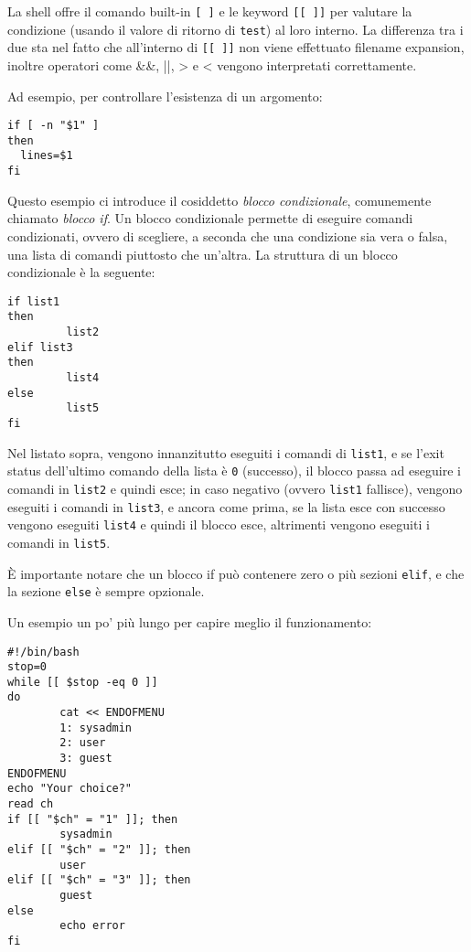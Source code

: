 La shell offre il comando built-in \verb_[ ]_ e le keyword
\verb_[[ ]]_ per valutare la condizione (usando il valore di
ritorno di \texttt{test}) al loro interno. La differenza tra i
due sta nel fatto che all'interno di \verb_[[ ]]_ non viene
effettuato filename expansion, inoltre operatori come \&\&, ||,
> e < vengono interpretati correttamente.

Ad esempio, per controllare l'esistenza di un argomento:
\begin{verbatim}
if [ -n "$1" ]
then
  lines=$1
fi
\end{verbatim}

Questo esempio ci introduce il cosiddetto \textit{blocco condizionale},
comunemente chiamato \textit{blocco if}.
Un blocco condizionale permette di eseguire comandi condizionati, ovvero di
scegliere, a seconda che una condizione sia vera o falsa, una lista di comandi
piuttosto che un'altra. La struttura di un blocco condizionale \`e la
seguente:
\begin{verbatim}
if list1
then
         list2
elif list3
then
         list4
else
         list5
fi
\end{verbatim}

Nel listato sopra, vengono innanzitutto eseguiti i comandi di \texttt{list1},
e se l'exit status dell'ultimo comando della lista \`e \texttt{0} (successo),
il blocco passa ad eseguire i comandi in \texttt{list2} e quindi esce; in
caso negativo (ovvero \texttt{list1} fallisce), vengono eseguiti i comandi in
\texttt{list3}, e ancora come prima, se la lista esce con successo vengono
eseguiti \texttt{list4} e quindi il blocco esce, altrimenti vengono eseguiti i
comandi in \texttt{list5}.

\`E importante notare che un blocco if pu\`o contenere zero o pi\`u sezioni
\texttt{elif}, e che la sezione \texttt{else} \`e sempre opzionale.

Un esempio un po' pi\`u lungo per capire meglio il funzionamento:
\begin{verbatim}
#!/bin/bash
stop=0
while [[ $stop -eq 0 ]]
do
        cat << ENDOFMENU
        1: sysadmin
        2: user
        3: guest
ENDOFMENU
echo "Your choice?"
read ch
if [[ "$ch" = "1" ]]; then
        sysadmin
elif [[ "$ch" = "2" ]]; then
        user
elif [[ "$ch" = "3" ]]; then
        guest
else
        echo error
fi
\end{verbatim}

